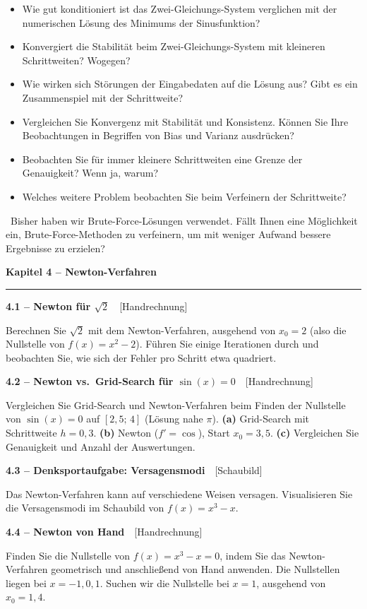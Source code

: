 \documentclass[a4paper,10pt]{article}
\newcommand{\kapitel}[1]{%
  \par\vspace{7pt}
  {\large\bfseries\color{accent} #1}\par
  \noindent\textcolor{accent}{\rule{\linewidth}{0.8pt}}\par\vspace{2pt}}
\newcommand{\aufg}[2]{%
  \par\vspace{3pt}
  {\bfseries\color{accent2} #1}~~{\footnotesize\color{accent2}[#2]}\par\vspace{1pt}}
\newcommand{\teaser}[1]{%
  \par\vspace{2pt}{\color{accent4}\textbf{Denkanstoß.}}~#1\par}
\newcommand{\reflexion}{%
  \par\vspace{2pt}{\bfseries\color{accent3} Selbstreflexionsfragen}\par\vspace{1pt}}
\begin{document}
\reflexion
\begin{itemize}
  \item Wie gut konditioniert ist das Zwei-Gleichungs-System verglichen mit der
        numerischen Lösung des Minimums der Sinusfunktion?
  \item Konvergiert die Stabilität beim Zwei-Gleichungs-System mit kleineren
        Schrittweiten? Wogegen?
  \item Wie wirken sich Störungen der Eingabedaten auf die Lösung aus? Gibt es ein
        Zusammenspiel mit der Schrittweite?
  \item Vergleichen Sie Konvergenz mit Stabilität und Konsistenz. Können Sie Ihre
        Beobachtungen in Begriffen von Bias und Varianz ausdrücken?
  \item Beobachten Sie für immer kleinere Schrittweiten eine Grenze der Genauigkeit?
        Wenn ja, warum?
  \item Welches weitere Problem beobachten Sie beim Verfeinern der Schrittweite?
\end{itemize}

\teaser{Bisher haben wir Brute-Force-Lösungen verwendet. Fällt Ihnen eine
Möglichkeit ein, Brute-Force-Methoden zu verfeinern, um mit weniger Aufwand bessere
Ergebnisse zu erzielen?}

\kapitel{Kapitel 4 \;--\; Newton-Verfahren}

\aufg{4.1 \;--\; Newton für $\sqrt{2}$}{Handrechnung}
Berechnen Sie $\sqrt{2}$ mit dem Newton-Verfahren, ausgehend von $x_0=2$ (also die
Nullstelle von $f(x)=x^2-2$). Führen Sie einige Iterationen durch und beobachten Sie,
wie sich der Fehler pro Schritt etwa quadriert.

\aufg{4.2 \;--\; Newton vs.\ Grid-Search für $\sin(x)=0$}{Handrechnung}
Vergleichen Sie Grid-Search und Newton-Verfahren beim Finden der Nullstelle von
$\sin(x)=0$ auf $[2{,}5;\,4]$ (Lösung nahe $\pi$). \textbf{(a)} Grid-Search mit
Schrittweite $h=0{,}3$. \textbf{(b)} Newton ($f'=\cos$), Start $x_0=3{,}5$.
\textbf{(c)} Vergleichen Sie Genauigkeit und Anzahl der Auswertungen.

\aufg{4.3 \;--\; Denksportaufgabe: Versagensmodi}{Schaubild}
Das Newton-Verfahren kann auf verschiedene Weisen versagen. Visualisieren Sie die
Versagensmodi im Schaubild von $f(x)=x^3-x$.

\aufg{4.4 \;--\; Newton von Hand}{Handrechnung}
Finden Sie die Nullstelle von $f(x)=x^3-x=0$, indem Sie das Newton-Verfahren
geometrisch und anschließend von Hand anwenden. Die Nullstellen liegen bei
$x=-1,0,1$. Suchen wir die Nullstelle bei $x=1$, ausgehend von $x_0=1{,}4$.
\end{document}
